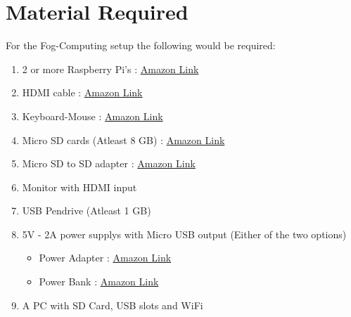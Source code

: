 \documentclass{article}
\begin{document}
\section{Material Required}
For the Fog-Computing setup the following would be required:
\begin{enumerate}
\item 2 or more Raspberry Pi's : \href{https://www.amazon.com/Raspberry-Pi-RASPBERRYPI3-MODB-1GB-Model-Motherboard/dp/B01CD5VC92/ref=sr_1_3?s=pc&ie=UTF8&qid=1528948400&sr=1-3&keywords=raspberry+pi+3}{Amazon Link}
\item HDMI cable : \href{https://www.amazon.com/AmazonBasics-High-Speed-HDMI-Cable-1-Pack/dp/B014I8SSD0/ref=sr_1_1_acs_sk_pb_1_sl_1?ie=UTF8&qid=1528948612&sr=8-1-acs&keywords=HDMI+Cable}{Amazon Link}
\item Keyboard-Mouse : \href{https://www.amazon.com/AmazonBasics-Wired-Keyboard-Mouse-Bundle/dp/B00B7GV802/ref=sr_1_1_sspa?s=electronics&ie=UTF8&qid=1528948656&sr=1-1-spons&keywords=keyboard+mouse&psc=1}{Amazon Link}
\item Micro SD cards (Atleast 8 GB) : \href{https://www.amazon.com/dp/B073JYVKNX/ref=sxts_k2p-hero-vn_bs_1?pf_rd_m=ATVPDKIKX0DER&pf_rd_p=3338417525430323799&pd_rd_wg=uUtqX&pf_rd_r=J02KSGBGGGV7S9B4CYZW&pf_rd_s=desktop-sx-top-slot&pf_rd_t=301&pd_rd_i=B073JYVKNX&pd_rd_w=4K3bM&pf_rd_i=micro+sd+card&pd_rd_r=8057615f-9cb8-4c23-ace6-39218b385876&ie=UTF8&qid=1528948722&sr=1}{Amazon Link}
\item Micro SD to SD adapter : \href{https://www.amazon.com/SanDisk-microSD-Memory-Adapter-MICROSD-ADAPTER/dp/B0047WZOOO/ref=sr_1_3?s=electronics&ie=UTF8&qid=1528949416&sr=1-3&keywords=micro+sd+to+sd+adapter}{Amazon Link}
\item Monitor with HDMI input
\item USB Pendrive (Atleast 1 GB)
\item 5V - 2A power supplys with Micro USB output (Either of the two options) 
\begin{itemize}
\item Power Adapter : \href{https://www.amazon.com/dp/B073JYVKNX/ref=sxts_k2p-hero-vn_bs_1?pf_rd_m=ATVPDKIKX0DER&pf_rd_p=3338417525430323799&pd_rd_wg=uUtqX&pf_rd_r=J02KSGBGGGV7S9B4CYZW&pf_rd_s=desktop-sx-top-slot&pf_rd_t=301&pd_rd_i=B073JYVKNX&pd_rd_w=4K3bM&pf_rd_i=micro+sd+card&pd_rd_r=8057615f-9cb8-4c23-ace6-39218b385876&ie=UTF8&qid=1528948722&sr=1}{Amazon Link}
\item Power Bank : \href{https://www.amazon.com/KMASHI-15000mAh-External-Portable-Powerful/dp/B00JP8MZGK/ref=sr_1_3?s=electronics&ie=UTF8&qid=1528949090&sr=1-3&keywords=5v+2a+power+bank}{Amazon Link}
\end{itemize}
\item A PC with SD Card, USB slots and WiFi
\end{enumerate}
\end{document}
